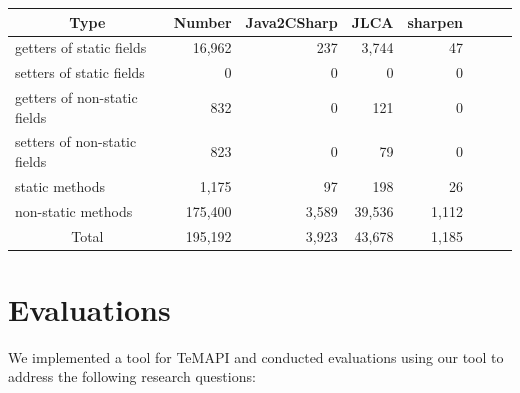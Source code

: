 \begin{table}[t]
\centering
\begin{SmallOut}
\begin {tabular} {|l|r|r|r|r|r|r|r|}
 \hline
\multicolumn{1}{|c}{\textbf{Type}}& \multicolumn{1}{|c|}{\textbf{Number}}
& \multicolumn{1}{|c|}{\textbf{Java2CSharp}} & \multicolumn{1}{|c|}{\textbf{JLCA}}& \multicolumn{1}{|c|}{\textbf{sharpen}} \\
\hline
getters of static fields      & 16,962 &   237 &  3,744 &  47 \\
\hline
setters of static fields      & 0      & 0     & 0      & 0  \\
\hline
getters of non-static fields  & 832    & 0    &   121  &  0  \\
\hline
setters of non-static fields  & 823    & 0    &   79   &  0   \\
\hline
static methods                & 1,175   & 97   &  198  &  26  \\
\hline
non-static methods            & 175,400 &3,589 &  39,536& 1,112  \\
\hline
\multicolumn{1}{|c|}{Total}   & 195,192 & 3,923 & 43,678 & 1,185\\
\hline
\end{tabular}%
 \label{table:java2csharp}
\end{SmallOut}\vspace*{-6ex}
\end{table}
\section{Evaluations}
\label{sec:evaluation}

We implemented a tool for TeMAPI and conducted evaluations using our tool to address the following research questions:

